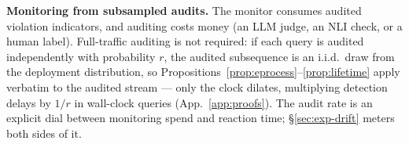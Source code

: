 \textbf{Monitoring from subsampled audits.} The monitor consumes
audited violation indicators, and auditing costs money (an LLM judge,
an NLI check, or a human label). Full-traffic auditing is not required:
if each query is audited independently with probability $r$, the
audited subsequence is an i.i.d.\ draw from the deployment
distribution, so Propositions~\ref{prop:eprocess}--\ref{prop:lifetime}
apply verbatim to the audited stream --- only the clock dilates,
multiplying detection delays by $1/r$ in wall-clock queries
(App.~\ref{app:proofs}). The audit rate is an explicit dial between
monitoring spend and reaction time; \S\ref{sec:exp-drift} meters both
sides of it.
